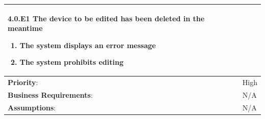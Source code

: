 \begin{table}[H]
\begin{adjustbox}{width=1.1\textwidth,center=\textwidth}
\begin{tabular}{|m{4cm}|m{12cm}|}
            \textbf{4.0.E1  The device to be edited has been deleted in the meantime}
            \begin{enumerate}
                \item The system displays an error message
                \item The system prohibits editing
            \end{enumerate} \\
            \hline
            \textbf{Priority}: & High \\
            \hline
            \textbf{Business Requirements}: & N/A \\
            \hline
            \textbf{Assumptions}: & N/A \\
            \hline
        \end{tabular}
    \end{adjustbox}
\end{table}

